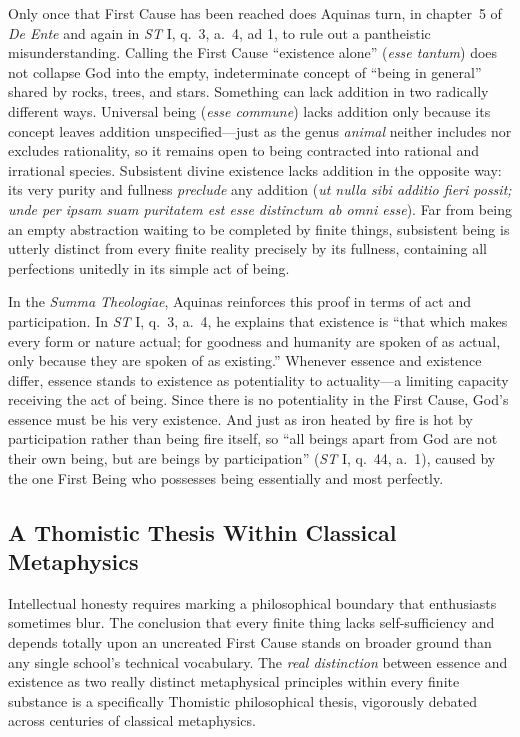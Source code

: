 Only once that First Cause has been reached does Aquinas turn, in chapter~5 of \emph{De Ente} and again in \emph{ST} I, q.\ 3, a.\ 4, ad 1, to rule out a pantheistic misunderstanding. Calling the First Cause ``existence alone'' (\emph{esse tantum}) does not collapse God into the empty, indeterminate concept of ``being in general'' shared by rocks, trees, and stars. Something can lack addition in two radically different ways. Universal being (\emph{esse commune}) lacks addition only because its concept leaves addition unspecified---just as the genus \emph{animal} neither includes nor excludes rationality, so it remains open to being contracted into rational and irrational species. Subsistent divine existence lacks addition in the opposite way: its very purity and fullness \emph{preclude} any addition (\emph{ut nulla sibi additio fieri possit; unde per ipsam suam puritatem est esse distinctum ab omni esse}). Far from being an empty abstraction waiting to be completed by finite things, subsistent being is utterly distinct from every finite reality precisely by its fullness, containing all perfections unitedly in its simple act of being.

In the \emph{Summa Theologiae}, Aquinas reinforces this proof in terms of act and participation. In \emph{ST} I, q.\ 3, a.\ 4, he explains that existence is ``that which makes every form or nature actual; for goodness and humanity are spoken of as actual, only because they are spoken of as existing.'' Whenever essence and existence differ, essence stands to existence as potentiality to actuality---a limiting capacity receiving the act of being. Since there is no potentiality in the First Cause, God's essence must be his very existence. And just as iron heated by fire is hot by participation rather than being fire itself, so ``all beings apart from God are not their own being, but are beings by participation'' (\emph{ST} I, q.\ 44, a.\ 1), caused by the one First Being who possesses being essentially and most perfectly.

\subsection{A Thomistic Thesis Within Classical Metaphysics}

Intellectual honesty requires marking a philosophical boundary that enthusiasts sometimes blur. The conclusion that every finite thing lacks self-sufficiency and depends totally upon an uncreated First Cause stands on broader ground than any single school's technical vocabulary. The \emph{real distinction} between essence and existence as two really distinct metaphysical principles within every finite substance is a specifically Thomistic philosophical thesis, vigorously debated across centuries of classical metaphysics.

